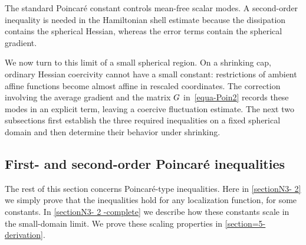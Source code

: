 \documentclass[11pt]{article}
\numberwithin{table}{section}
\numberwithin{equation}{section}
\numberwithin{table}{section}
\numberwithin{figure}{section}
\begin{document}
The standard Poincar\'e constant controls mean-free scalar modes.  A second-order inequality is needed in the Hamiltonian shell estimate because the dissipation contains the spherical Hessian, whereas the error terms contain the spherical gradient.

We now turn to this limit of a small spherical region.
On a shrinking cap, ordinary Hessian coercivity cannot have a small constant: restrictions of ambient affine functions become almost affine in rescaled coordinates.  The correction involving the average gradient and the matrix $G$ in~\eqref{equa-Poin2} records these modes in an explicit term, leaving a coercive fluctuation estimate. The next two subsections first establish the three required inequalities on a fixed spherical domain and then determine their behavior under shrinking.

% 


\subsection{First- and second-order Poincar\'e inequalities}
\label{sectionN3- 2}

The rest of this section concerns Poincaré-type inequalities.  Here in \autoref{sectionN3- 2} we simply prove that the inequalities hold for any localization function, for some constants.  In \autoref{sectionN3- 2 -complete} we describe how these constants scale in the small-domain limit. We prove these scaling properties in \autoref{section=5-derivation}.
\end{document}
